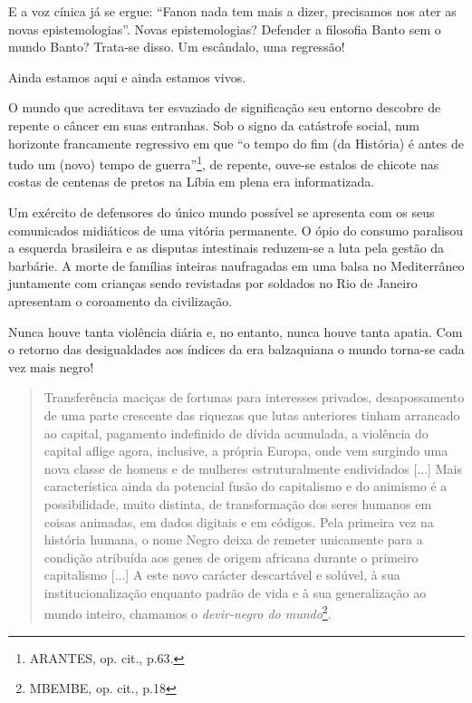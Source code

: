 E a voz cínica já se ergue: ``Fanon nada tem mais a dizer, precisamos
nos ater as novas epistemologias''. Novas epistemologias? Defender a
filosofia Banto sem o mundo Banto? Trata-se disso. Um escândalo, uma
regressão!

Ainda estamos aqui e ainda estamos vivos.

O mundo que acreditava ter esvaziado de significação seu entorno
descobre de repente o câncer em suas entranhas. Sob o signo da
catástrofe social, num horizonte francamente regressivo em que ``o tempo
do fim (da História) é antes de tudo um (novo) tempo de
guerra''\footnote{ARANTES, op. cit., p.63.}, de repente, ouve-se estalos
de chicote nas costas de centenas de pretos na Líbia em plena era
informatizada.

Um exército de defensores do único mundo possível se apresenta com os
seus comunicados midiáticos de uma vitória permanente. O ópio do consumo
paralisou a esquerda brasileira e as disputas intestinais reduzem-se a
luta pela gestão da barbárie. A morte de famílias inteiras naufragadas
em uma balsa no Mediterrâneo juntamente com crianças sendo revistadas
por soldados no Rio de Janeiro apresentam o coroamento da civilização.

Nunca houve tanta violência diária e, no entanto, nunca houve tanta
apatia. Com o retorno das desigualdades aos índices da era balzaquiana o
mundo torna-se cada vez mais negro!

\begin{quote}
Transferência maciças de fortunas para interesses privados,
desapossamento de uma parte crescente das riquezas que lutas anteriores
tinham arrancado ao capital, pagamento indefinido de dívida acumulada, a
violência do capital aflige agora, inclusive, a própria Europa, onde vem
surgindo uma nova classe de homens e de mulheres estruturalmente
endividados {[}...{]} Mais característica ainda da potencial fusão do
capitalismo e do animismo é a possibilidade, muito distinta, de
transformação dos seres humanos em coisas animadas, em dados digitais e
em códigos. Pela primeira vez na história humana, o nome Negro deixa de
remeter unicamente para a condição atribuída aos genes de origem
africana durante o primeiro capitalismo {[}...{]} A este novo carácter
descartável e solúvel, à sua institucionalização enquanto padrão de vida
e à sua generalização ao mundo inteiro, chamamos o \emph{devir-negro do
mundo}\footnote{MBEMBE, op. cit., p.18}.
\end{quote}

